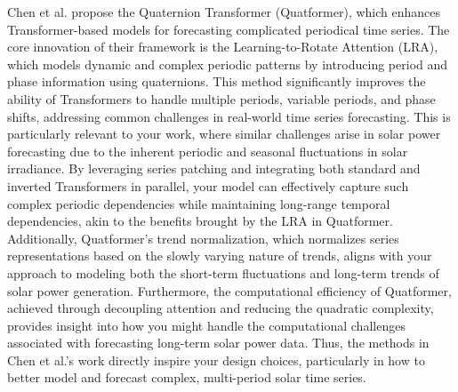 \documentclass[12pt]{uomthesis}
\begin{document}
Chen et al. \cite{chen2022learning} propose the Quaternion Transformer (Quatformer), which enhances Transformer-based models for forecasting complicated periodical time series. The core innovation of their framework is the Learning-to-Rotate Attention (LRA), which models dynamic and complex periodic patterns by introducing period and phase information using quaternions. This method significantly improves the ability of Transformers to handle multiple periods, variable periods, and phase shifts, addressing common challenges in real-world time series forecasting. This is particularly relevant to your work, where similar challenges arise in solar power forecasting due to the inherent periodic and seasonal fluctuations in solar irradiance. By leveraging series patching and integrating both standard and inverted Transformers in parallel, your model can effectively capture such complex periodic dependencies while maintaining long-range temporal dependencies, akin to the benefits brought by the LRA in Quatformer. Additionally, Quatformer’s trend normalization, which normalizes series representations based on the slowly varying nature of trends, aligns with your approach to modeling both the short-term fluctuations and long-term trends of solar power generation. Furthermore, the computational efficiency of Quatformer, achieved through decoupling attention and reducing the quadratic complexity, provides insight into how you might handle the computational challenges associated with forecasting long-term solar power data. Thus, the methods in Chen et al.’s work directly inspire your design choices, particularly in how to better model and forecast complex, multi-period solar time series.
\end{document}
